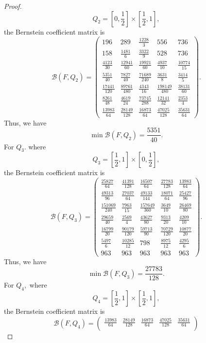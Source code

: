 \documentclass[10pt,a4paper]{amsart}
\begin{document}
\begin{proof}
\[
Q_2=\left[0,\frac12\right]\times\left[\frac12,1\right],
\]
the Bernstein coefficient matrix is
\[
\mathcal B(F,Q_2)=
\begin{pmatrix}
	196 & 289 & \frac{1228}{3} & 556 & 736\\[5mm]
	158 & \frac{1481}{6} & \frac{3322}{9} & 528 & 736\\[5mm]
	\frac{4123}{30} & \frac{12941}{60} & \frac{19921}{60} & \frac{4937}{10} & \frac{10774}{15}\\[5mm]
	\frac{5351}{40} & \frac{7827}{40} & \frac{71689}{240} & \frac{3631}{8} & \frac{3414}{5}\\[5mm]
	\frac{17441}{120} & \frac{89761}{480} & \frac{4343}{16} & \frac{198149}{480} & \frac{38131}{60}\\[5mm]
	\frac{8261}{48} & \frac{4619}{24} & \frac{73745}{288} & \frac{12141}{32} & \frac{2353}{4}\\[5mm]
	\frac{13983}{64} & \frac{28149}{128} & \frac{16873}{64} & \frac{47025}{128} & \frac{35631}{64}
\end{pmatrix}.
\]
Thus, we have
\[
\min \mathcal B(F,Q_2)=\frac{5351}{40}.
\]
For $Q_{3}.$ where
\[
Q_3=\left[\frac12,1\right]\times\left[0,\frac12\right],
\]
the Bernstein coefficient matrix is
\[
\mathcal B(F,Q_3)=
\begin{pmatrix}
	\frac{25827}{64} & \frac{41391}{128} & \frac{16507}{64} & \frac{27783}{128} & \frac{13983}{64}\\[5mm]
	\frac{49313}{96} & \frac{27037}{64} & \frac{49133}{144} & \frac{18071}{64} & \frac{25427}{96}\\[5mm]
	\frac{151069}{240} & \frac{7963}{15} & \frac{157649}{360} & \frac{3649}{10} & \frac{26469}{80}\\[5mm]
	\frac{29659}{40} & \frac{2569}{4} & \frac{43627}{80} & \frac{9313}{20} & \frac{4209}{10}\\[5mm]
	\frac{16799}{20} & \frac{90179}{120} & \frac{59713}{90} & \frac{70729}{120} & \frac{10877}{20}\\[5mm]
	\frac{5497}{6} & \frac{10285}{12} & 798 & \frac{8975}{12} & \frac{4295}{6}\\[5mm]
	963 & 963 & 963 & 963 & 963
\end{pmatrix}.
\]
Thus, we have
\[
\min \mathcal B(F,Q_3)=\frac{27783}{128}.
\]
For $Q_{4},$ where
\[
Q_4=\left[\frac12,1\right]\times\left[\frac12,1\right],
\]
the Bernstein coefficient matrix is
\[
\mathcal B(F,Q_4)=
\begin{pmatrix}
	\frac{13983}{64} & \frac{28149}{128} & \frac{16873}{64} & \frac{47025}{128} & \frac{35631}{64}\\[5mm]

\end{pmatrix}\]
\end{proof}
\end{document}
